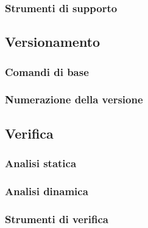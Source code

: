 \subsubsection{Strumenti di supporto}

\subsection{Versionamento}
\subsubsection{Comandi di base}

\subsubsection{Numerazione della versione}

\subsection{Verifica}
\subsubsection{Analisi statica}

\subsubsection{Analisi dinamica}

\subsubsection{Strumenti di verifica}